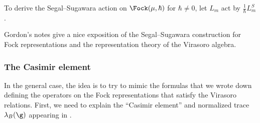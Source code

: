 \begin{remark}
	To derive the Segal--Sugawara action on $ \Fock(\mu,\hbar) $ for $ \hbar \neq 0 $, let $ L_{m} $ act by $ \frac{1}{\hbar} L_{m}^S $.
\end{remark}

\begin{remark}
	Gordon's notes \cite{Gordon:InfiniteLie} give a nice exposition of the Segal--Sugawara construction for Fock representations and the representation theory of the Virasoro algebra.
\end{remark}


\subsubsection{The Casimir element}\label{subsec:Casimir}

In the general case, the idea is to try to mimic the formulas that we wrote down defining the operators on the Fock representations that satisfy the Virasoro relations.
First, we need to explain the ``Casimir element'' and normalized trace $ \lambda_B(\g) $ appearing in .

